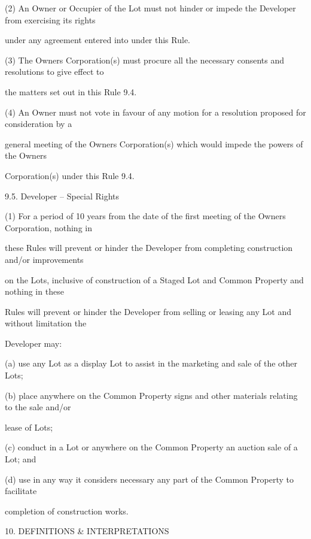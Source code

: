 \documentclass{article}
\begin{document}
{\fontsize{9.962}{1}(2) An Owner or Occupier of the Lot must not hinder or impede the Developer from exercising its rights }

{\fontsize{10.02}{1}under any agreement entered into under this Rule. }

{\fontsize{9.962}{1}(3) The Owners Corporation(s) must procure all the necessary consents and resolutions to give effect to }

{\fontsize{10.02}{1}the matters set out in this Rule 9.4. }

{\fontsize{9.962}{1}(4) An Owner must not vote in favour of any motion for a resolution proposed for consideration by a }

{\fontsize{10.02}{1}general meeting of the Owners Corporation(s) which would impede the powers of the Owners }

{\fontsize{10.02}{1}Corporation(s) under this Rule 9.4. }

{\fontsize{9.99}{1}9.5. Developer – Special Rights }

{\fontsize{9.962}{1}(1) For a period of 10 years from the date of the first meeting of the Owners Corporation, nothing in }

{\fontsize{10.02}{1}these Rules will prevent or hinder the Developer from completing construction and/or improvements }

{\fontsize{10.02}{1}on the Lots, inclusive of construction of a Staged Lot and Common Property and nothing in these }

{\fontsize{10.02}{1}Rules will prevent or hinder the Developer from selling or leasing any Lot and without limitation the }

{\fontsize{10.02}{1}Developer may: }

{\fontsize{9.962}{1}(a) use any Lot as a display Lot to assist in the marketing and sale of the other Lots; }

{\fontsize{9.962}{1}(b) place anywhere on the Common Property signs and other materials relating to the sale and/or }

{\fontsize{10.02}{1}lease of Lots; }

{\fontsize{9.962}{1}(c) conduct in a Lot or anywhere on the Common Property an auction sale of a Lot; and }

{\fontsize{9.962}{1}(d) use in any way it considers necessary any part of the Common Property to facilitate }

{\fontsize{10.02}{1}completion of construction works. }


{\fontsize{9.99}{1}10. DEFINITIONS \& INTERPRETATIONS }
\end{document}
